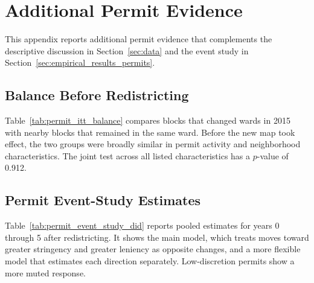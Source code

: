 
\section{Additional Permit Evidence}
\label{sec:appendix_permits}

This appendix reports additional permit evidence that complements the descriptive discussion in Section~\ref{sec:data} and the event study in Section~\ref{sec:empirical_results_permits}.

\subsection{Balance Before Redistricting}

Table~\ref{tab:permit_itt_balance} compares blocks that changed wards in 2015 with nearby blocks that remained in the same ward.
Before the new map took effect, the two groups were broadly similar in permit activity and neighborhood characteristics.
The joint test across all listed characteristics has a $p$-value of 0.912.



\subsection{Permit Event-Study Estimates}

Table~\ref{tab:permit_event_study_did} reports pooled estimates for years 0 through 5 after redistricting.
It shows the main model, which treats moves toward greater stringency and greater leniency as opposite changes, and a more flexible model that estimates each direction separately.
Low-discretion permits show a more muted response.

